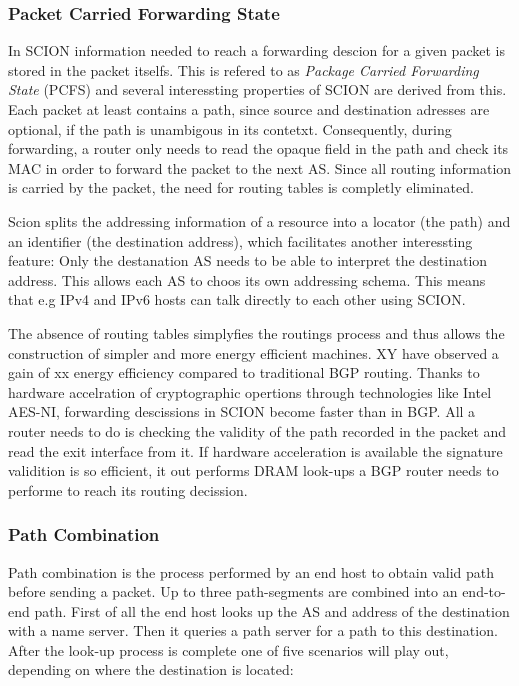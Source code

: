 \documentclass[../eva1_scion.tex]{subfiles}
\begin{document}
    \subsubsection{Packet Carried Forwarding State}\label{ssec:pcfs}
    In SCION information needed to reach a forwarding descion for a given packet is stored in the packet itselfs. This is refered to as \textit{Package Carried Forwarding State} (PCFS) and several interessting properties of SCION are derived from this. Each packet at least contains a path, since source and destination adresses are optional, if the path is unambigous in its contetxt. Consequently, during forwarding, a router only needs to read the opaque field in the path and check its MAC in order to forward the packet to the next AS. Since all routing information is carried by the packet, the need for routing tables is completly eliminated.

    Scion splits the addressing information of a resource into a locator (the path) and an identifier (the destination address), which facilitates another interessting feature: Only the destanation AS needs to be able to interpret the destination address. This allows each AS to choos its own addressing schema. This means that e.g IPv4 and IPv6 hosts can talk directly to each other using SCION.

    The absence of routing tables simplyfies the routings process and thus allows the construction of simpler and more energy efficient machines. XY have observed a gain of xx  energy efficiency compared to traditional BGP routing. Thanks to hardware accelration of cryptographic opertions through technologies like Intel AES-NI, forwarding descissions in SCION become faster than in BGP. All a router needs to do is checking the validity of the path recorded in the packet and read the exit interface from it. If hardware acceleration is available the signature validition is so efficient, it out performs DRAM look-ups a BGP router needs to performe to reach its routing decission. 

    \subsubsection{Path Combination} \label{ssec:path_assembly}
    Path combination is the process performed by an end host to obtain valid path before sending a packet. Up to three path-segments are combined into an end-to-end path. First of all the end host looks up the AS and address of the destination with a name server. Then it queries a path server for a path to this destination. After the look-up process is complete one of five scenarios will play out, depending on where the destination is located:
\end{document}

